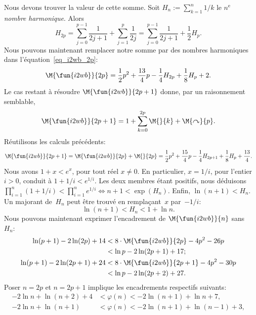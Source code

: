 Nous devons trouver la valeur de cette somme. Soit \(H_n :=
\sum_{k=1}^n{1/k}\) le \(n^\text{e}\) \emph{nombre
  harmonique}. Alors
\begin{equation*}
H_{2p} = \sum_{j=0}^{p-1}{\frac{1}{2j+1}} + \sum_{j=1}^{p}{\frac{1}{2j}}
      = \sum_{j=0}^{p-1}{\frac{1}{2j+1}} + \frac{1}{2}{H_{p}}.
\end{equation*}
Nous pouvons maintenant remplacer notre somme par des nombres
harmoniques dans l'équation~\eqref{eq_i2wb_2p}:
\begin{equation*}
\M{\fun{i2wb}}{2p}
  = \frac{1}{2}{p^2} + \frac{13}{4}{p} - \frac{1}{4}{H_{2p}}
    + \frac{1}{8}{H_p} + 2.
\end{equation*}
Le cas restant à résoudre \(\M{\fun{i2wb}}{2p+1}\) donne, par un
raisonnement semblable,
\begin{equation*}
\M{\fun{i2wb}}{2p+1}
  = 1 + \sum_{k=0}^{2p}{\M{}{k}} + \M{\curvearrowright}{p}.
\end{equation*}
Réutilisons les calculs précédents:
\begin{equation*}
\M{\fun{i2wb}}{2p+1}
   = \M{\fun{i2wb}}{2p} + \M{}{2p}
   = \frac{1}{2}{p^2} + \frac{15}{4}{p} - \frac{1}{4}{H_{2p+1}}
     + \frac{1}{8}{H_p} + \frac{13}{4}.
\end{equation*}
Nous avons \(1 + x < e^x\), pour tout réel \(x \neq 0\). En
particulier, \(x=1/i\), pour l'entier \(i>0\), conduit à \(1 + 1/i <
e^{1/i}\). Les deux membres étant positifs, nous déduisons
\(\prod_{i=1}^{n}(1+1/i) < \prod_{i=1}^{n}{e^{1/i}} \Leftrightarrow
n+1 < \exp(H_n)\). Enfin, \(\ln(n+1) < H_n\). Un majorant de~\(H_n\)
peut être trouvé en remplaçant~\(x\) par~\(-1/i\):
\begin{equation}
\ln(n+1) < H_n < 1 + \ln n.\label{ineq_Hn}
\end{equation}
Nous pouvons maintenant exprimer l'encadrement de
\(\M{\fun{i2wb}}{n}\) sans~\(H_n\):
\begin{align*}
\ln(p+1) - 2\ln(2p) + 14
&< 8 \cdot \M{\fun{i2wb}}{2p} - 4{p^2} - 26{p}\\
& < \ln p - 2\ln(2p+1) + 17;\\
\ln(p+1) - 2\ln(2p+1) + 24
&< 8 \cdot \M{\fun{i2wb}}{2p+1} - 4{p^2} - 30{p}\\
&< \ln{p} - 2\ln(2p+2) + 27.
\end{align*}
Poser \(n=2p\) et \(n=2p+1\) implique les encadrements respectifs
suivants:
\begin{align*}
-2\ln n + \ln(n+2) + 4 &< \varphi(n) < -2\ln(n+1) + \ln n + 7,\\
-2\ln n + \ln(n+1)     &< \varphi(n) < -2\ln(n+1) + \ln(n-1) + 3,
\end{align*}
